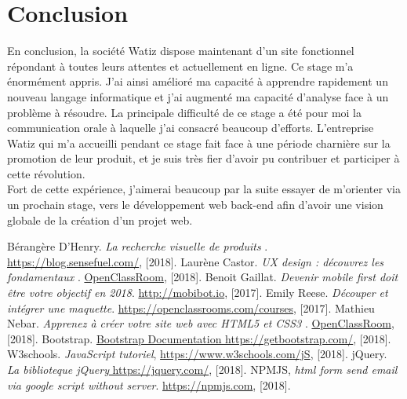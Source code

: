 \documentclass[a4paper, 12pt]{report}
\begin{document}
 
\section{Conclusion}
En conclusion, la société Watiz dispose maintenant d’un site fonctionnel répondant à toutes leurs attentes et actuellement en ligne. 
Ce stage m’a énormément appris. J'ai ainsi amélioré ma capacité à apprendre rapidement un nouveau langage informatique et j'ai augmenté ma capacité d'analyse face à un problème à résoudre. 
La principale difficulté de ce stage a été pour moi la communication orale à laquelle j'ai consacré beaucoup d'efforts. 
L’entreprise Watiz qui m’a accueilli pendant ce stage fait face à une période charnière sur la promotion de leur produit, et je suis très fier d’avoir pu contribuer et participer à cette révolution.\\

Fort de cette expérience, j’aimerai beaucoup par la suite essayer de m’orienter via un prochain stage, vers le développement web back-end afin d'avoir une vision globale de la création d'un projet web. 

% 
%  
{} 
\begin{thebibliography}{9}
Bérangère D'Henry. \emph{La recherche visuelle de produits }.
\href{https://blog.sensefuel.com/la-recherche-visuelle-de-produits-les-images-plutot-que-les-mots}{https://blog.sensefuel.com/}, [2018].
Laurène Castor. \emph{UX design : découvrez les fondamentaux }. 
\href{https://openclassrooms.com/courses/decouvrez-les-fondamentaux-de-l-ux-design}{OpenClassRoom}, [2018].
Benoit Gaillat. \emph{Devenir mobile first doit être votre objectif en 2018}. 
\href{http://mobibot.io/blog/420/devenir-mobile-first-doit-etre-votre-objectif-en-2018.html}{http://mobibot.io}, [2017].
Emily Reese. \emph{Découper et intégrer une maquette}.
\href{https://openclassrooms.com/courses/apprenez-a-creer-votre-site-web-avec-html5-et-css3}{https://openclassrooms.com/courses}, [2017].
Mathieu Nebar. \emph{Apprenez à créer votre site web avec HTML5 et CSS3 }.
\href{https://openclassrooms.com/courses/apprenez-a-creer-votre-site-web-avec-html5-et-css3}{OpenClassRoom},[2018].
Bootstrap. \href{https://getbootstrap.com/docs/4.1/getting-started/introduction/}{Bootstrap Documentation https://getbootstrap.com/}, [2018].
W3schools. \emph{JavaScript tutoriel}, \href{https://www.w3schools.com/jS/default.asp}{https://www.w3schools.com/jS}, [2018].
jQuery. \emph{La biblioteque jQuery}\href{https://jquery.com/}{ https://jquery.com/}, [2018].
NPMJS, \emph{html form send email via google script without server}.
\href{https://npmjs.com/package/html-form-send-email-via-google-script-without-server}{https://npmjs.com}, [2018].

\end{thebibliography}
\end{document}
